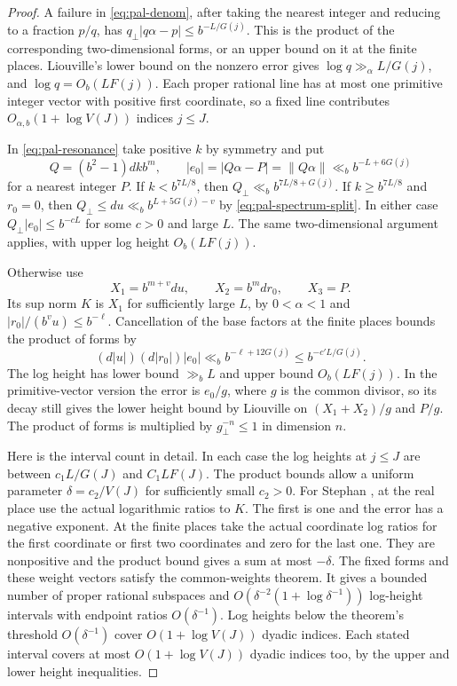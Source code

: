 \begin{proof}
A failure in \eqref{eq:pal-denom}, after taking the nearest integer and reducing to a fraction \(p/q\), has \(q_\perp|q\alpha-p|\le b^{-L/G(j)}\). This is the product of the corresponding two-dimensional forms, or an upper bound on it at the finite places. Liouville's lower bound on the nonzero error gives \(\log q\gg_\alpha L/G(j)\), and \(\log q=O_b(LF(j))\). Each proper rational line has at most one primitive integer vector with positive first coordinate, so a fixed line contributes \(O_{\alpha,b}(1+\log V(J))\) indices \(j\le J\).

In \eqref{eq:pal-resonance} take positive \(k\) by symmetry and put
\[
 Q=(b^2-1)d k b^m,\qquad |e_0|=|Q\alpha-P|=\|Q\alpha\|
                                 \ll_b b^{-L+6G(j)}
\]
for a nearest integer \(P\). If \(k<b^{7L/8}\), then \(Q_\perp\ll_b b^{7L/8+G(j)}\). If \(k\ge b^{7L/8}\) and \(r_0=0\), then \(Q_\perp\le d u\ll_b b^{L+5G(j)-v}\) by \eqref{eq:pal-spectrum-split}. In either case \(Q_\perp|e_0|\le b^{-cL}\) for some \(c>0\) and large \(L\). The same two-dimensional argument applies, with upper log height \(O_b(LF(j))\).

Otherwise use
\[
                  X_1=b^{m+v}d u,\qquad
                  X_2=b^m d r_0,\qquad X_3=P.
\]
Its sup norm \(K\) is \(X_1\) for sufficiently large \(L\), by \(0<\alpha<1\) and \(|r_0|/(b^v u)\le b^{-\ell}\). Cancellation of the base factors at the finite places bounds the product of forms by
\[
               (d|u|)(d|r_0|)|e_0|
                           \ll_b b^{-\ell+12G(j)}
                           \le b^{-c'L/G(j)}.
\]
The log height has lower bound \(\gg_b L\) and upper bound \(O_b(LF(j))\). In the primitive-vector version the error is \(e_0/g\), where \(g\) is the common divisor, so its decay still gives the lower height bound by Liouville on \((X_1+X_2)/g\) and \(P/g\). The product of forms is multiplied by \(g_\perp^{-n}\le1\) in dimension \(n\).

Here is the interval count in detail. In each case the log heights at \(j\le J\) are between \(c_1 L/G(J)\) and \(C_1 LF(J)\). The product bounds allow a uniform parameter \(\delta=c_2/V(J)\) for sufficiently small \(c_2>0\). For Stephan \cite[Theorem~4.2]{Stephan}, at the real place use the actual logarithmic ratios to \(K\). The first is one and the error has a negative exponent. At the finite places take the actual coordinate log ratios for the first coordinate or first two coordinates and zero for the last one. They are nonpositive and the product bound gives a sum at most \(-\delta\). The fixed forms and these weight vectors satisfy the common-weights theorem. It gives a bounded number of proper rational subspaces and \(O(\delta^{-2}(1+\log\delta^{-1}))\) log-height intervals with endpoint ratios \(O(\delta^{-1})\). Log heights below the theorem's threshold \(O(\delta^{-1})\) cover \(O(1+\log V(J))\) dyadic indices. Each stated interval covers at most \(O(1+\log V(J))\) dyadic indices too, by the upper and lower height inequalities.


\end{proof}

